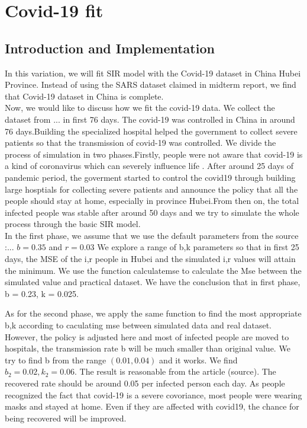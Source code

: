 \documentclass{article}
\begin{document}
 \section{Covid-19 fit}
\subsection{Introduction and Implementation}
In this variation, we will fit SIR model with the Covid-19 dataset in China Hubei Province. Instead of using the SARS dataset claimed in midterm report, we find that Covid-19 dataset in China is complete. \\

Now, we would like to discuss how we fit the covid-19 data. We collect the dataset from ... in first 76 days. The covid-19 was controlled in China in around 76 days.Building the specialized hospital helped the government to collect severe patients so that the transmission of covid-19 was controlled. We divide the process of simulation in two phases.Firstly, people were not aware that covid-19 is a kind of coronavirus which can severely influence life . After around 25 days of pandemic period, the goverment started to control the covid19 through building large hosptials for collecting severe patients and announce the policy that all the people should stay at home, especially in province Hubei.From then on, the total infected people was stable after around 50 days and we try to simulate the whole process through the basic SIR model.\\

In the first phase, we assume that we use the default parameters from the source :... $b = 0.35$  and $r = 0.03$ We explore a range of b,k parameters so that in first 25 days, the MSE of the i,r people in Hubei and the simulated i,r values will attain the minimum. We use the function calculatemse to calculate the Mse between the simulated value and practical dataset. We have the conclusion that in first phase, b = 0.23, k = 0.025.

As for the second phase, we apply the same function to find the most appropriate b,k according to caculating mse between simulated data and real dataset. However, the policy is adjusted here and most of infected people are moved to hospitals, the transmission rate b will be much smaller than original value. We try to find b from the range $(0.01,0.04)$ and it works. We find $b_{2}= 0.02,k_{2} = 0.06$. The result is reasonable from the article (source).
The recovered rate should be around 0.05 per infected person each day. As people recognized the fact that covid-19 is a severe covoriance, most people were wearing masks and stayed at home. Even if they are affected with covid19, the chance for being recovered will be improved.
\end{document}

